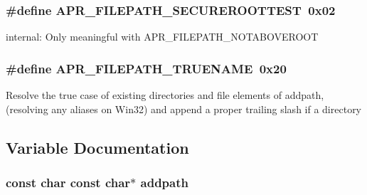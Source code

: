 \subsubsection[{\texorpdfstring{A\+P\+R\+\_\+\+F\+I\+L\+E\+P\+A\+T\+H\+\_\+\+S\+E\+C\+U\+R\+E\+R\+O\+O\+T\+T\+E\+ST}{APR_FILEPATH_SECUREROOTTEST}}]{\setlength{\rightskip}{0pt plus 5cm}\#define A\+P\+R\+\_\+\+F\+I\+L\+E\+P\+A\+T\+H\+\_\+\+S\+E\+C\+U\+R\+E\+R\+O\+O\+T\+T\+E\+ST~0x02}\hypertarget{group__apr__filepath_ga48b6cabfa91e6070c45977ba7035f328}{}\label{group__apr__filepath_ga48b6cabfa91e6070c45977ba7035f328}
internal\+: Only meaningful with A\+P\+R\+\_\+\+F\+I\+L\+E\+P\+A\+T\+H\+\_\+\+N\+O\+T\+A\+B\+O\+V\+E\+R\+O\+OT 
\subsubsection[{\texorpdfstring{A\+P\+R\+\_\+\+F\+I\+L\+E\+P\+A\+T\+H\+\_\+\+T\+R\+U\+E\+N\+A\+ME}{APR_FILEPATH_TRUENAME}}]{\setlength{\rightskip}{0pt plus 5cm}\#define A\+P\+R\+\_\+\+F\+I\+L\+E\+P\+A\+T\+H\+\_\+\+T\+R\+U\+E\+N\+A\+ME~0x20}\hypertarget{group__apr__filepath_gafb7dd411e9ef212a03051806cb60c9d8}{}\label{group__apr__filepath_gafb7dd411e9ef212a03051806cb60c9d8}
Resolve the true case of existing directories and file elements of addpath, (resolving any aliases on Win32) and append a proper trailing slash if a directory 

\subsection{Variable Documentation}
\subsubsection[{\texorpdfstring{addpath}{addpath}}]{\setlength{\rightskip}{0pt plus 5cm}const char const char$\ast$ addpath}\hypertarget{group__apr__filepath_ga1a839ed2f56c94498b87e75f7d44632c}{}\label{group__apr__filepath_ga1a839ed2f56c94498b87e75f7d44632c}
